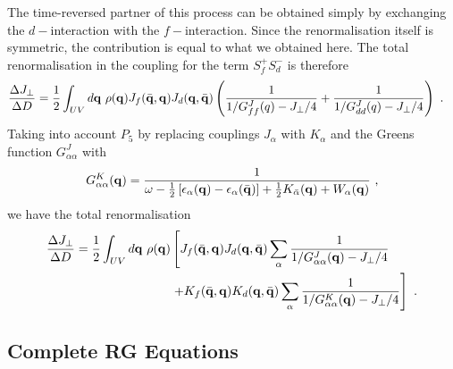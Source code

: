 The time-reversed partner of this process can be obtained simply by exchanging the \(d-\)interaction with the \(f-\)interaction. Since the renormalisation itself is symmetric, the contribution is equal to what we obtained here. The total renormalisation in the coupling for the term \(S_f^+ S_d^-\) is therefore
\begin{equation}\begin{aligned}
	\frac{\Delta J_\perp}{\Delta D} &= \frac{1}{2} \int_{UV} d{\bf q} ~\rho({\bf q}) J_f(\bar{\bf q},{\bf q}) J_d({\bf q},\bar{\bf q})\left(\frac{1}{1/G^J_{ff}(q) - J_\perp/4} + \frac{1}{1/G^J_{dd}(q) - J_\perp/4}\right)~.
\end{aligned}\end{equation}
Taking into account \(P_5\) by replacing couplings \(J_\alpha\) with \(K_\alpha\) and the Greens function \(G^J_{\alpha\alpha}\) with
\begin{equation}\begin{aligned}
	G^{K}_{\alpha\alpha}({\bf q}) = \frac{1}{\omega - \frac{1}{2}\left[\epsilon_\alpha({\bf q}) - \epsilon_\alpha(\bar{\bf q})\right] + \frac{1}{2}K_{\bar\alpha}({\bf q}) + W_\alpha({\bf q})}~,
\end{aligned}\end{equation}
we have the total renormalisation
\begin{equation}\begin{aligned}
	\frac{\Delta J_\perp}{\Delta D} = \frac{1}{2} \int_{UV} d{\bf q} ~\rho({\bf q}) &\left[J_f(\bar{\bf q},{\bf q}) J_d({\bf q},\bar{\bf q})\sum_\alpha \frac{1}{1/G^J_{\alpha\alpha}({\bf q}) - J_\perp/4} \right.\\
									&\left.+ K_f(\bar{\bf q},{\bf q}) K_d({\bf q},\bar{\bf q})\sum_\alpha \frac{1}{1/G^K_{\alpha\alpha}({\bf q}) - J_\perp/4}\right]~.
\end{aligned}\end{equation}

\subsection{Complete RG Equations}
